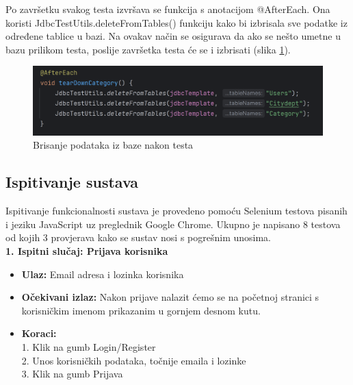             Po završetku svakog testa izvršava se funkcija s anotacijom @AfterEach.
			Ona koristi JdbcTestUtils.deleteFromTables() funkciju kako bi izbrisala sve podatke iz određene tablice u bazi.
			Na ovakav način se osigurava da ako se nešto umetne u bazu prilikom testa,
			poslije završetka testa će se i izbrisati (slika \ref{fig:afterEach}).
            \begin{figure}[H]
                \includegraphics[scale=0.60]{slike/IT_afterEach.png}
                \centering
                \caption{Brisanje podataka iz baze nakon testa}
                \label{fig:afterEach}
            \end{figure}

            \eject
			
			
			
			\subsection{Ispitivanje sustava}

			Ispitivanje funkcionalnosti sustava je provedeno pomoću Selenium testova
			pisanih i jeziku JavaScript uz preglednik Google Chrome. Ukupno je napisano
			8 testova od kojih 3 provjerava kako se sustav nosi s pogrešnim unosima.
			 \\
			\textbf{1. Ispitni slučaj: Prijava korisnika}
			 \begin{itemize}
				\item \textbf{Ulaz:} Email adresa i lozinka korisnika 
				\item \textbf{Očekivani izlaz:} Nakon prijave nalazit ćemo se na početnoj stranici s korisničkim imenom prikazanim u gornjem desnom kutu.
				\item \textbf{Koraci:} 
				\\ 1. Klik na gumb Login/Register
				\\ 2. Unos korisničkih podataka, točnije emaila i lozinke
				\\ 3. Klik na gumb Prijava
			\end{itemize}

